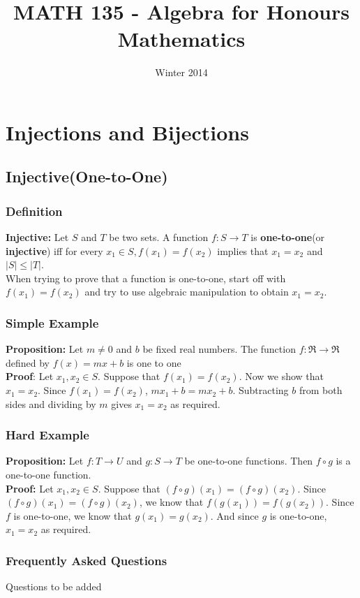 \documentclass[12pt]{report}
\title{MATH 135 - Algebra for Honours Mathematics}
\author{}
\date{Winter 2014}
\begin{document}
\maketitle
\tableofcontents

\chapter{Injections and Bijections}
	\section{Injective(One-to-One)}
		\subsection{Definition}
			\textbf{Injective:} Let $S$ and $T$ be two sets. A function $f: S \rightarrow T$ is \textbf{one-to-one}(or \textbf{injective}) iff for every $x_1 \in S, f(x_1) = f(x_2)$ implies that $x_1 = x_2$ and $|S| \leq |T|$. \\
			When trying to prove that a function is one-to-one, start off with $f(x_1) = f(x_2)$ and try to use algebraic manipulation to obtain $x_1 = x_2$. 
		\subsection{Simple Example}
			\textbf{Proposition:} Let $m \neq 0$ and $b$ be fixed real numbers. The function $f: \Re \rightarrow \Re$ defined by $f(x) = mx + b$ is one to one\\
			\textbf{Proof}: Let $x_1, x_2 \in S$. Suppose that $f(x_1) = f(x_2)$. Now we show that $x_1 = x_2$. Since $f(x_1) = f(x_2)$, $mx_1 + b = mx_2 + b$. Subtracting $b$ from both sides and dividing by $m$ gives $x_1 = x_2$ as required.
		\subsection{Hard Example}
			\textbf{Proposition:} Let $f: T \rightarrow U$ and $g:S \rightarrow T$ be one-to-one functions. Then $f \circ g$ is a one-to-one function.\\
			\textbf{Proof:} Let $x_1, x_2 \in S$. Suppose that $(f \circ g)(x_1) = (f \circ g)(x_2)$. Since $(f \circ g)(x_1) = (f \circ g)(x_2)$, we know that $f(g(x_1)) = f(g(x_2))$. Since $f$ is one-to-one, we know that $g(x_1) = g(x_2)$. And since $g$ is one-to-one, $x_1 = x_2$ as required. 
		\subsection{Frequently Asked Questions}
			Questions to be added
\end{document}
